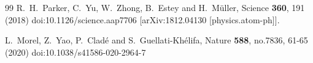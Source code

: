 \documentclass[10pt,a4paper]{jarticle}
\begin{document}
\begin{thebibliography}{99}
R.~H.~Parker, C.~Yu, W.~Zhong, B.~Estey and H.~M{\"u}ller,
Science \textbf{360}, 191 (2018)
doi:10.1126/science.aap7706
[arXiv:1812.04130 [physics.atom-ph]].

L.~Morel, Z.~Yao, P.~Clad{\'e} and S.~Guellati-Kh{\'e}lifa,
Nature \textbf{588}, no.7836, 61-65 (2020)
doi:10.1038/s41586-020-2964-7

\end{thebibliography}
\end{document}
